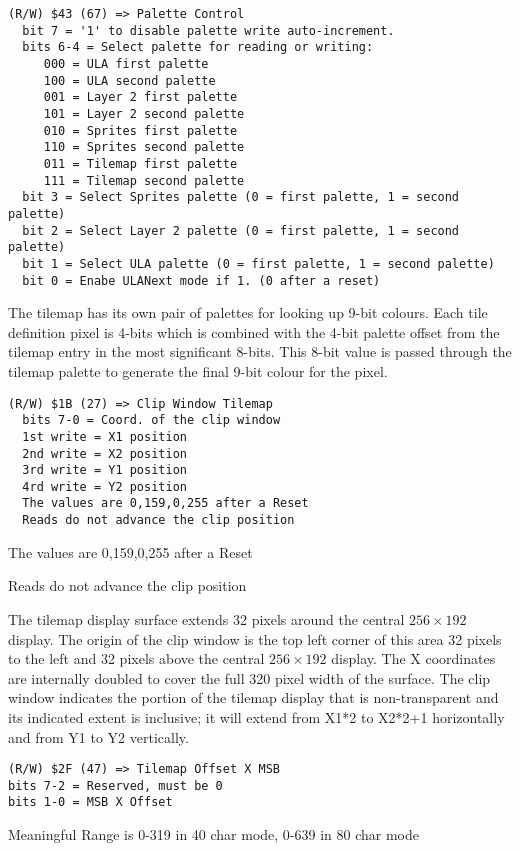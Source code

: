 \begin{verbatim}
(R/W) $43 (67) => Palette Control
  bit 7 = '1' to disable palette write auto-increment.
  bits 6-4 = Select palette for reading or writing:
     000 = ULA first palette
     100 = ULA second palette
     001 = Layer 2 first palette
     101 = Layer 2 second palette
     010 = Sprites first palette 
     110 = Sprites second palette
     011 = Tilemap first palette
     111 = Tilemap second palette
  bit 3 = Select Sprites palette (0 = first palette, 1 = second palette)
  bit 2 = Select Layer 2 palette (0 = first palette, 1 = second palette)
  bit 1 = Select ULA palette (0 = first palette, 1 = second palette)
  bit 0 = Enabe ULANext mode if 1. (0 after a reset)
\end{verbatim}

The tilemap has its own pair of palettes for looking up 9-bit
colours. Each tile definition pixel is 4-bits which is combined with
the 4-bit palette offset from the tilemap entry in the most
significant 8-bits. This 8-bit value is passed through the tilemap
palette to generate the final 9-bit colour for the pixel.

\begin{verbatim}
(R/W) $1B (27) => Clip Window Tilemap
  bits 7-0 = Coord. of the clip window
  1st write = X1 position
  2nd write = X2 position
  3rd write = Y1 position
  4rd write = Y2 position
  The values are 0,159,0,255 after a Reset
  Reads do not advance the clip position
\end{verbatim}

The values are 0,159,0,255 after a Reset

Reads do not advance the clip position

The tilemap display surface extends 32 pixels around the central
$256\times192$ display. The origin of the clip window is the top left
corner of this area 32 pixels to the left and 32 pixels above the
central $256\times192$ display. The X coordinates are internally
doubled to cover the full 320 pixel width of the surface. The clip
window indicates the portion of the tilemap display that is
non-transparent and its indicated extent is inclusive; it will extend
from X1*2 to X2*2+1 horizontally and from Y1 to Y2 vertically.

\begin{verbatim}
(R/W) $2F (47) => Tilemap Offset X MSB
bits 7-2 = Reserved, must be 0
bits 1-0 = MSB X Offset
\end{verbatim}

Meaningful Range is 0-319 in 40 char mode, 0-639 in 80 char mode

